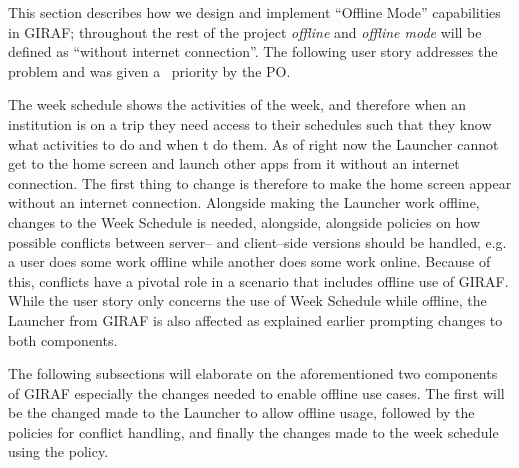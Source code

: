 This section describes how we design and implement \enquote{Offline Mode} capabilities in GIRAF; throughout the rest of the project \textit{offline} and \textit{offline mode} will be defined as \enquote{without internet connection}.
The following user story addresses the problem and was given a \phigh~priority by the PO.

\begin{center}
\end{center}
The week schedule shows the activities of the week, and therefore when an institution is on a trip they need access to their schedules such that they know what activities to do and when t do them.
As of right now the Launcher cannot get to the home screen and launch other apps from it without an internet connection.
The first thing to change is therefore to make the home screen appear without an internet connection.
Alongside making the Launcher work offline, changes to the Week Schedule is needed, alongside, alongside policies on how possible conflicts between server-- and client--side versions should be handled, e.g. a user does some work offline while another does some work online.
Because of this, conflicts have a pivotal role in a scenario that includes offline use of GIRAF.
While the user story only concerns the use of Week Schedule while offline, the Launcher from GIRAF is also affected  as explained earlier prompting changes to both components.

The following subsections will elaborate on the aforementioned two components of GIRAF especially the changes needed to enable offline use cases.
The first will be the changed made to the Launcher to allow offline usage, followed by the policies for conflict handling, and finally the changes made to the week schedule using the policy.
